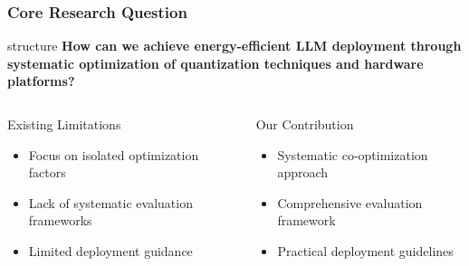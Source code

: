 \documentclass[aspectratio=169,xcolor=dvipsnames]{beamer}
\newcommand{\highlight}[1]{\textbf{#1}}
\begin{document}
\begin{frame}
\frametitle{Core Research Question}

\begin{center}
\begin{beamercolorbox}[wd=0.9\textwidth,center]{structure}
\Large\textbf{How can we achieve energy-efficient LLM deployment through systematic optimization of \highlight{quantization techniques} and \highlight{hardware platforms}?}
\end{beamercolorbox}
\end{center}

\vspace{1cm}

\begin{columns}[c]
\begin{block}{Existing Limitations}
\begin{itemize}
\item Focus on isolated optimization factors
\item Lack of systematic evaluation frameworks
\item Limited deployment guidance
\end{itemize}
\end{block}

\begin{exampleblock}{Our Contribution}
\begin{itemize}
\item Systematic co-optimization approach
\item Comprehensive evaluation framework
\item Practical deployment guidelines
\end{itemize}
\end{exampleblock}

\end{columns}
\end{frame}
\end{document}
